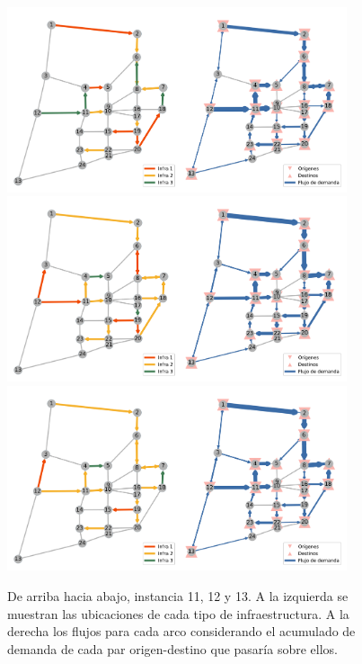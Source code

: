 \documentclass{article}
\begin{document}
  \begin{figure}[h!]
    \centering
    \includegraphics[width=10cm]{../resources/sioux_falls_0.4_budget_factor_linear_5_breakpoints.png}
    \includegraphics[width=10cm]{../resources/sioux_falls_0.4_budget_factor_linear_20_breakpoints.png}
    \includegraphics[width=10cm]{../resources/sioux_falls_0.4_budget_factor_linear_50_breakpoints.png}
    \caption{De arriba hacia abajo, instancia 11, 12 y 13. A la izquierda se muestran las ubicaciones de cada tipo de infraestructura. A la derecha los flujos para cada arco considerando el acumulado de demanda de cada par origen-destino que pasaría sobre ellos.}
    \label{fig:sensibilityinstance11_12_13}
  \end{figure}
\end{document}
